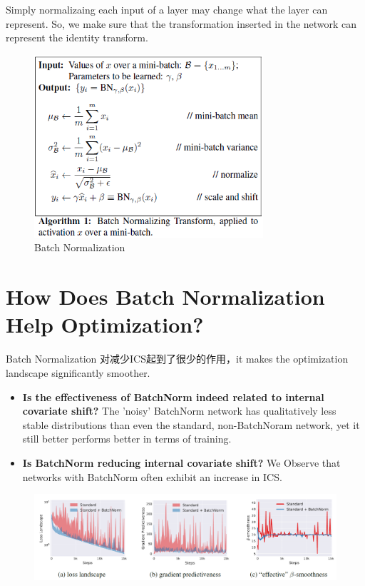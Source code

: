 Simply normalizaing each input of a layer may change what the layer can represent. So, we make sure that
the transformation inserted in the network can represent the identity transform.
\begin{figure}[H]
    \centering
    \includegraphics[width=8.5cm]{images/bn_algorithm.png}
    \caption{Batch Normalization}
    \label{fig:batchnorm}
\end{figure}

\section{How Does Batch Normalization Help Optimization?}
Batch Normalization 对减少ICS起到了很少的作用，it makes the optimization landscape significantly smoother.
\begin{itemize}
    \item \textbf{Is the effectiveness of BatchNorm indeed related to internal covariate shift?} The 'noisy' BatchNorm 
    network has qualitatively less stable distributions than even the standard, non-BatchNoram network, yet it still 
    better performs better in terms of training.
    \item \textbf{Is BatchNorm reducing internal covariate shift?} We Observe that networks with BatchNorm often
    exhibit an increase in ICS.
\end{itemize}
\begin{figure}[H]
    \centering
    \includegraphics[width=14cm]{images/bn_landscape.png}
    \label{fig:bn_landscape}
\end{figure}

